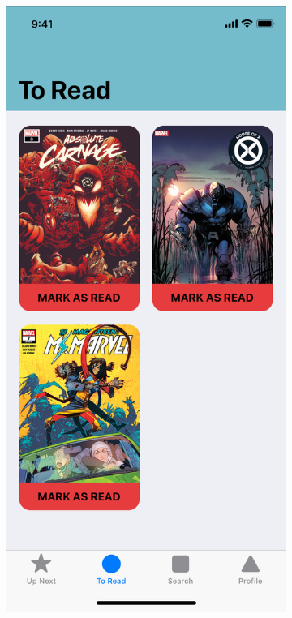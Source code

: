 \clearpage

\begin{figure}[p]
  \begin{subfigure}[b]{0.4\textwidth}
    \includegraphics[width=\textwidth]{img/mockups/to_read}

\end{subfigure}
\end{figure}
